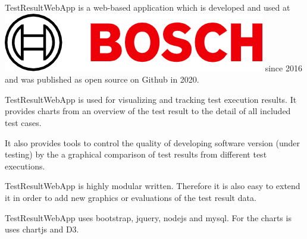 



TestResultWebApp is a web-based application which is developed and used at 
\includegraphics[height=\fontcharht\font`\B]{./pictures/Bosch-Logo.png} since 2016 and was published
as open source on Github in 2020.

TestResultWebApp is used for visualizing and tracking test execution results. It 
provides charts from an overview of the test result to the detail of all included 
test cases.

It also provides tools to control the quality of developing software version 
(under testing) by the a graphical comparison of test results from different
test executions.

TestResultWebApp is highly modular written. Therefore it is also easy to extend
it in order to add new graphics or evaluations of the test result data.

TestResultWebApp uses bootstrap, jquery, nodejs and mysql. For the charts is uses
chartjs and D3.